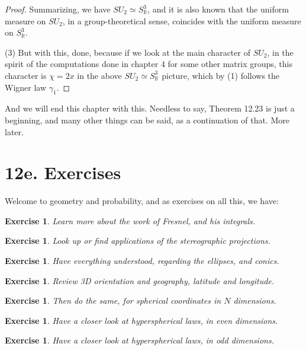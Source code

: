 \documentclass[12pt]{amsbook}
\newtheorem{exercise}[theorem]{Exercise}
\begin{document}
\begin{proof}
Summarizing, we have $SU_2\simeq S^3_\mathbb R$, and it is also known that the uniform measure on $SU_2$, in a group-theoretical sense, coincides with the uniform measure on $S^3_\mathbb R$.

\medskip

(3) But with this, done, because if we look at the main character of $SU_2$, in the spirit of the computations done in chapter 4 for some other matrix groups, this character is $\chi=2x$ in the above $SU_2\simeq S^3_\mathbb R$ picture, which by (1) follows the Wigner law $\gamma_1$.
\end{proof}

And we will end this chapter with this. Needless to say, Theorem 12.23 is just a beginning, and many other things can be said, as a continuation of that. More later.

\section*{12e. Exercises}

Welcome to geometry and probability, and as exercises on all this, we have:

\begin{exercise}
Learn more about the work of Fresnel, and his integrals.
\end{exercise}

\begin{exercise}
Look up or find applications of the stereographic projections.
\end{exercise}

\begin{exercise}
Have everything understood, regarding the ellipses, and conics.
\end{exercise}

\begin{exercise}
Review 3D orientation and geography, latitude and longitude.
\end{exercise}

\begin{exercise}
Then do the same, for spherical coordinates in $N$ dimensions.
\end{exercise}

\begin{exercise}
Have a closer look at hyperspherical laws, in even dimensions.
\end{exercise}

\begin{exercise}
Have a closer look at hyperspherical laws, in odd dimensions.
\end{exercise}
\end{document}
